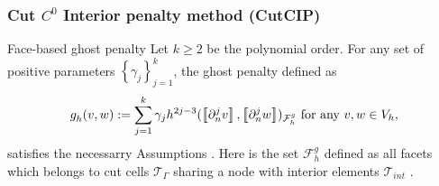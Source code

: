 \begin{frame}
\frametitle{ Cut $C^0$ Interior penalty method (CutCIP) }


\begin{block}{Face-based ghost penalty}
    Let $k\ge 2$ be the polynomial order.
    For any set of positive parameters $\left\{ \gamma _{j} \right\} _{j=1}^{k}$, the ghost penalty defined as \[
    g^{}_{h}( v,w)  := \sum_{j=1}^{k} \gamma _{j} h^{2j-3}_{} ( \jump{ \partial ^{j}_{n} v }, \jump{ \partial ^{j}_{n} w }  ) _{\mathcal{F} _{h}^{g}} \text{ for any } v,w \in V_{h},
    \]
    satisfies the necessarry Assumptions \footnotemark[2].
    Here is the set $\mathcal{F} _{h}^{g}$ defined as all facets which belongs to cut cells $\mathcal{T} _{\Gamma }$ sharing a node with interior elements $\mathcal{T} _{int }$ .

\end{block}


\end{frame}


